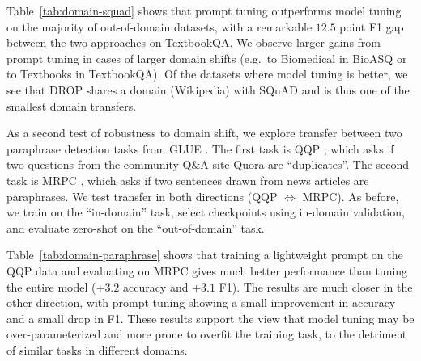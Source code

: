 \documentclass[11pt]{article}
\begin{document}
Table~\ref{tab:domain-squad} shows that prompt tuning outperforms model tuning on the majority of out-of-domain datasets, with a remarkable $12.5$ point F1 gap between the two approaches on TextbookQA. We observe larger gains from prompt tuning in cases of larger domain shifts (e.g.~to Biomedical in BioASQ or to Textbooks in TextbookQA). Of the datasets where model tuning is better, we see that DROP shares a domain (Wikipedia) with SQuAD and is thus one of the smallest domain transfers.

As a second test of robustness to domain shift, we explore transfer between two paraphrase detection tasks from GLUE \cite{wang2019glue}. The first task is QQP \cite{WinNT}, which asks if two questions from the community Q\&A site Quora are ``duplicates''. The second task is MRPC \cite{dolan2005automatically}, which asks if two sentences drawn from news articles are paraphrases. We test transfer in both directions (QQP $\Leftrightarrow$ MRPC). As before, we train on the ``in-domain'' task, select checkpoints using in-domain validation, and evaluate zero-shot on the ``out-of-domain'' task.

\begin{table}[]
\footnotesize
\centering
{}
\caption{
    Mean and stddev of zero-shot domain transfer between two paraphrase detection tasks.
}
\label{tab:domain-paraphrase}
\end{table}

Table~\ref{tab:domain-paraphrase} shows that training a lightweight prompt on the QQP data and evaluating on MRPC gives much better performance than tuning the entire model (+$3.2$ accuracy and +$3.1$ F1). The results are much closer in the other direction, with prompt tuning showing a small improvement in accuracy and a small drop in F1\@. These results support the view that model tuning may be over-parameterized and more prone to overfit the training task, to the detriment of similar tasks in different domains.
\end{document}
